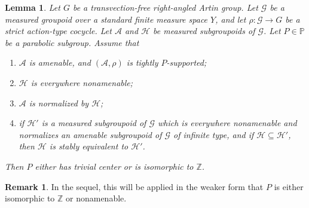 \documentclass[11pt]{article}
\numberwithin{equation}{section}
\let\mathcal\mathscr
\theoremstyle{plain}
\newtheorem{lemma}[theo]{Lemma}
\theoremstyle{definition}
\newtheorem{rk}[theo]{Remark}
\newcommand{\cala}{\mathcal{A}}
\newcommand{\calg}{\mathcal{G}}
\newcommand{\calh}{\mathcal{H}}
\begin{document}
\begin{lemma}\label{lemma:amenable-normal-maximal}
Let $G$ be a transvection-free right-angled Artin group. Let $\calg$ be a measured groupoid over a standard finite measure space $Y$, and let $\rho:\calg\to G$ be a strict action-type cocycle. Let $\cala$ and $\calh$ be measured subgroupoids of $\calg$. Let $P\in\mathbb{P}$ be a parabolic subgroup. Assume that
\begin{enumerate}
\item $\cala$ is amenable, and $(\cala,\rho)$ is tightly $P$-supported;
\item $\calh$ is everywhere nonamenable;
\item $\cala$ is normalized by $\calh$;
\item if $\calh'$ is a measured subgroupoid of $\calg$ which is everywhere nonamenable and normalizes an amenable subgroupoid of $\calg$ of infinite type, and if $\calh\subseteq\calh'$, then $\calh$ is stably equivalent to $\calh'$.
\end{enumerate}
Then $P$ either has trivial center or is isomorphic to $\mathbb{Z}$.
\end{lemma}

\begin{rk}
In the sequel, this will be applied in the weaker form that $P$ is either isomorphic to $\mathbb{Z}$ or nonamenable.
\end{rk}
\end{document}
